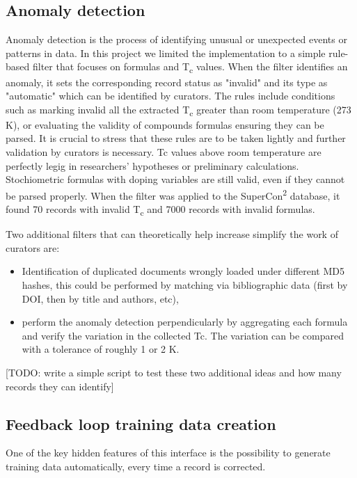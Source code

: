 \documentclass{article}
\begin{document}
\subsection{Anomaly detection}
\label{subsec:anomaly-detection}
Anomaly detection is the process of identifying unusual or unexpected events or patterns in data. In this project we limited the implementation to a simple rule-based filter that focuses on formulas and T\textsubscript{c} values.
When the filter identifies an anomaly, it sets the corresponding record status as "invalid" and its type as "automatic" which can be identified by curators. 
The rules include conditions such as marking invalid all the extracted T\textsubscript{c} greater than room temperature (273 K), or evaluating the validity of compounds formulas ensuring they can be parsed. 
It is crucial to stress that these rules are to be taken lightly and further validation by curators is necessary. Tc values above room temperature are perfectly legig in researchers' hypotheses or preliminary calculations. Stochiometric formulas with doping variables are still valid, even if they cannot be parsed properly. 
When the filter was applied to the SuperCon\textsuperscript{2} database, it found 70 records with invalid T\textsubscript{c} and 7000 records with invalid formulas. 

Two additional filters that can theoretically help increase simplify the work of curators are: 
\begin{itemize}
    \item Identification of duplicated documents wrongly loaded under different MD5 hashes, this could be performed by matching via bibliographic data (first by DOI, then by title and authors, etc), 
    \item perform the anomaly detection perpendicularly by aggregating each formula and verify the variation in the collected Tc. The variation can be compared with a tolerance of roughly 1 or 2 K. 
\end{itemize}

[TODO: write a simple script to test these two additional ideas and how many records they can identify]

\subsection{Feedback loop training data creation}

One of the key hidden features of this interface is the possibility to generate training data automatically, every time a record is corrected. 
\end{document}
